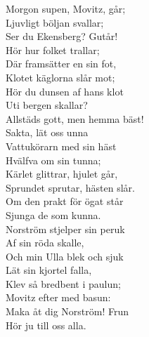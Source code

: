 \documentclass[a6paper, 10pt, twoside]{article}
\begin{document}
\begin{lyrics}
\newpage
\noindent
Morgon supen, Movitz, går;\\
Ljuvligt böljan svallar;\\
Ser du Ekensberg? Gutår!\\
Hör hur folket trallar;\\
Där framsätter en sin fot,\\
Klotet käglorna slår mot;\\
Hör du dunsen af hans klot\\
Uti bergen skallar?
\vspace{5pt}\\
Allstäds gott, men hemma bäst!\\
Sakta, lät oss unna\\
Vattukörarn med sin häst\\
Hvälfva om sin tunna;\\
Kärlet glittrar, hjulet går,\\
Sprundet sprutar, hästen slår.\\
Om den prakt för ögat står\\
Sjunga de som kunna.
\vspace{5pt}\\
Norström stjelper sin peruk\\
Af sin röda skalle,\\
Och min Ulla blek och sjuk\\
Lät sin kjortel falla,\\
Klev så bredbent i paulun;\\
Movitz efter med basun:\\
Maka åt dig Norström! Frun\\
Hör ju till oss alla.
\end{lyrics}
\end{document}
